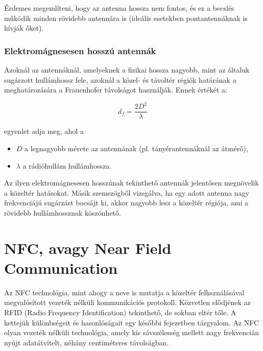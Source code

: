 \documentclass[12pt]{article}
\begin{document}
Érdemes megemlíteni, hogy az antenna hossza nem fontos, és ez a becslés működik minden
rövidebb antennára is (ideális esetekben pontantennáknak is hívják őket).

\subsubsection{Elektromágnesesen hosszú antennák}
Azoknál az antennáknál, amelyeknek a fizikai hossza nagyobb, mint az általuk sugárzott
hullámhossz fele, azoknál a közel- és távoltér régiók határának a meghatározására a 
Frauenhofer távolságot használják. Ennek értékét a:

\begin{equation}
d_f = \frac{2D^2}{\lambda}
\end{equation}

egyenlet adja meg, ahol a
\begin{itemize}
\item $D$ a legnagyobb mérete az antennának (pl. tányérantennáknál az átmérő),
\item $\lambda$ a rádióhullám hullámhossza.
\end{itemize} 

Az ilyen elektromágnesesen hosszúnak tekinthető antennák jelentősen megnövelik a
közeltér hatásokat. Másik szemszögből vizsgálva, ha egy adott antenna nagy 
frekvenciájú sugárzást bocsájt ki, akkor nagyobb lesz a közeltér régiója, ami a
rövidebb hullámhossznak köszönhető.

\section[NFC]{NFC, avagy Near Field Communication}
Az NFC technológia, mint ahogy a neve is mutatja a közeltér felhsználásával
megvalósított vezeték nélküli kommunikációs protokoll. Közvetlen elődjének az
RFID (Radio Frequency Identification) tekinthető, de sokban eltér tőle. A 
kettejük különbségeit és hasonlóságait egy későbbi fejezetben tárgyalom.
Az NFC olyan vezeték nélküli technológia, amely kis sávszélesség mellett
nagy frekvencián nyújt adatátvitelt, néhány centiméteres távolságban.
\end{document}
